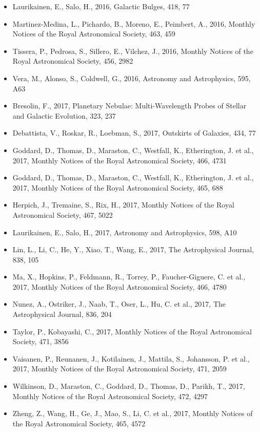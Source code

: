 \documentclass{letter}
\begin{document}
\begin{enumerate}
\begin{itemize}
\item Laurikainen, E., Salo, H., 2016, Galactic Bulges, 418, 77
\item Martinez-Medina, L., Pichardo, B., Moreno, E., Peimbert, A., 2016, Monthly Notices of the Royal Astronomical Society, 463, 459
\item Tissera, P., Pedrosa, S., Sillero, E., Vilchez, J., 2016, Monthly Notices of the Royal Astronomical Society, 456, 2982
\item Vera, M., Alonso, S., Coldwell, G., 2016, Astronomy and Astrophysics, 595, A63
\item Bresolin, F., 2017, Planetary Nebulae: Multi-Wavelength Probes of Stellar and Galactic Evolution, 323, 237
\item Debattista, V., Roskar, R., Loebman, S., 2017, Outskirts of Galaxies, 434, 77
\item Goddard, D., Thomas, D., Maraston, C., Westfall, K., Etherington, J. et al., 2017, Monthly Notices of the Royal Astronomical Society, 466, 4731
\item Goddard, D., Thomas, D., Maraston, C., Westfall, K., Etherington, J. et al., 2017, Monthly Notices of the Royal Astronomical Society, 465, 688
\item Herpich, J., Tremaine, S., Rix, H., 2017, Monthly Notices of the Royal Astronomical Society, 467, 5022
\item Laurikainen, E., Salo, H., 2017, Astronomy and Astrophysics, 598, A10
\item Lin, L., Li, C., He, Y., Xiao, T., Wang, E., 2017, The Astrophysical Journal, 838, 105
\item Ma, X., Hopkins, P., Feldmann, R., Torrey, P., Faucher-Giguere, C. et al., 2017, Monthly Notices of the Royal Astronomical Society, 466, 4780
\item Nunez, A., Ostriker, J., Naab, T., Oser, L., Hu, C. et al., 2017, The Astrophysical Journal, 836, 204
\item Taylor, P., Kobayashi, C., 2017, Monthly Notices of the Royal Astronomical Society, 471, 3856
\item Vaisanen, P., Reunanen, J., Kotilainen, J., Mattila, S., Johansson, P. et al., 2017, Monthly Notices of the Royal Astronomical Society, 471, 2059
\item Wilkinson, D., Maraston, C., Goddard, D., Thomas, D., Parikh, T., 2017, Monthly Notices of the Royal Astronomical Society, 472, 4297
\item Zheng, Z., Wang, H., Ge, J., Mao, S., Li, C. et al., 2017, Monthly Notices of the Royal Astronomical Society, 465, 4572

\end{itemize}
\end{enumerate}
\end{document}
